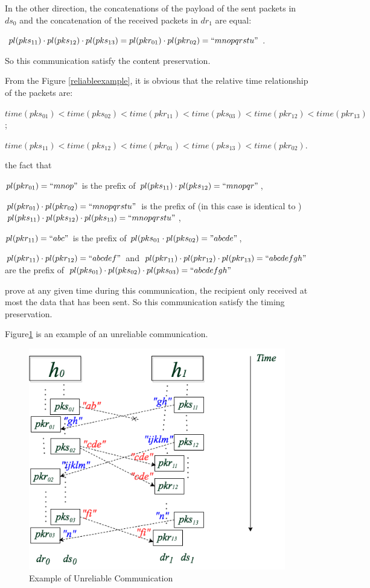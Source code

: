 In the other direction, the concatenations of the payload of the sent packets in $ds_0$ and the concatenation of the received packets in $dr_1$ are equal:

$pl(pks_{11}) \cdot pl(pks_{12}) \cdot pl(pks_{13}) = pl(pkr_{01}) \cdot pl(pkr_{02}) = ``mnopqrstu"$. 

So this communication satisfy the content preservation. 

From the Figure \ref{reliableexample}, it is obvious that the relative time relationship of the packets are: 

$time(pks_{01}) < time(pks_{02}) < time(pkr_{11})< time(pks_{03}) < time(pkr_{12}) < time(pkr_{13}) $;

$time(pks_{11}) < time(pks_{12}) < time(pkr_{01})< time(pks_{13}) < time(pkr_{02})$. 

the fact that
 
$pl(pkr_{01}) = ``mnop"$ is the prefix of $pl(pks_{11}) \cdot  pl(pks_{12}) = ``mnopqr"$,

$pl(pkr_{01}) \cdot pl(pkr_{02})=``mnopqrstu"$ is the prefix of (in this case is identical to ) $pl(pks_{11}) \cdot pl(pks_{12}) \cdot pl(pks_{13}) = ``mnopqrstu" $,  

$pl(pkr_{11})=``abc"$ is the prefix of $pl(pks_{01} \cdot pl(pks_{02}) = "abcde"$,  

$pl(pkr_{11}) \cdot pl(pkr_{12})= ``abcdef"$ and  $pl(pkr_{11}) \cdot pl(pkr_{12}) \cdot pl(pkr_{13}) = ``abcdefgh"$ are  the prefix of  $pl(pks_{01}) \cdot pl(pks_{02}) \cdot pl(pks_{03})= ``abcdefgh"$

prove at any given time during this communication, the recipient only received at most the data that has been sent. So this communication satisfy the timing preservation. 


Figure\ref{unreliableexample} is an example of an unreliable communication. 

\begin{figure}[H]
\centerline{\includegraphics[scale=0.5]{Figures/unreliableexample}}
\caption{Example of Unreliable Communication}
\label{unreliableexample}
\end{figure}

